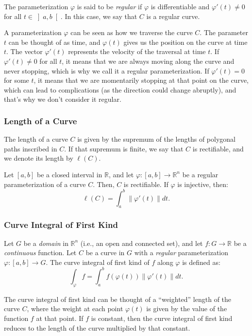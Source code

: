 The parameterization $\varphi$ is said to be \emph{regular} if $\varphi$ is differentiable and $\varphi'(t) \neq 0$ for all $t \in \left]a, b\right[$. In this case, we say that $C$ is a regular curve.
\begin{observacion}
    A parameterization $\varphi$ can be seen as how we traverse the curve $C$. The parameter $t$ can be thought of as time, and $\varphi(t)$ gives us the position on the curve at time $t$. The vector $\varphi'(t)$ represents the velocity of the traversal at time $t$. If $\varphi'(t) \neq 0$ for all $t$, it means that we are always moving along the curve and never stopping, which is why we call it a regular parameterization. If $\varphi'(t) = 0$ for some $t$, it means that we are momentarily stopping at that point on the curve, which can lead to complications (as the direction could change abruptly), and that's why we don't consider it regular.
\end{observacion}

\subsubsection{Length of a Curve}

The length of a curve $C$ is given by the supremum of the lengths of polygonal paths inscribed in $C$. If that supremum is finite, we say that $C$ is rectifiable, and we denote its length by $\ell(C)$.
\begin{prop}
    Let $[a, b]$ be a closed interval in $\mathbb{R}$, and let $\varphi : [a, b] \to \mathbb{R}^n$ be a regular parameterization of a curve $C$. Then, $C$ is rectifiable. If $\varphi$ is injective, then:
    \[
        \ell(C) = \int_a^b \|\varphi'(t)\| dt.
    \]
\end{prop}


\subsubsection{Curve Integral of First Kind}
Let $G$ be a \emph{domain} in $\mathbb{R}^n$ (i.e., an open and connected set), and let $f : G \to \mathbb{R}$ be a \emph{continuous} function. Let $C$ be a curve in $G$ with a \emph{regular} parameterization $\varphi : [a, b] \to G$. The curve integral of first kind of $f$ along $\varphi$ is defined as:
\[
    \int_\varphi f = \int_a^b f(\varphi(t)) \|\varphi'(t)\| dt.
\]
\begin{observacion}
    The curve integral of first kind can be thought of a ``weighted'' length of the curve $C$, where the weight at each point $\varphi(t)$ is given by the value of the function $f$ at that point. If $f$ is constant, then the curve integral of first kind reduces to the length of the curve multiplied by that constant.
\end{observacion}

